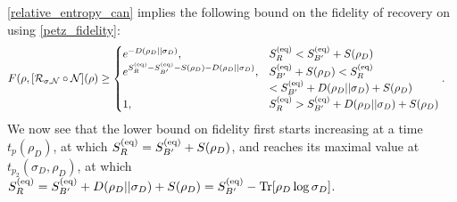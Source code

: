 \documentclass[a4paper,11pt]{article}
\begin{document}
\begin{enumerate}
\eqref{relative_entropy_can} implies the following bound on the fidelity of recovery on using \eqref{petz_fidelity}: 
\begin{align}
 &F(\rho, [\mathcal{R}_{\sigma,\mathcal{N}}\circ \mathcal{N}](\rho) \geq 
 \begin{cases}
 e^{-D(\rho_D \lvert \rvert \sigma_D)},& S_{R}^{\rm (eq)} <S_{B'}^{\rm (eq)} + S(\rho_D) 
 \\
 e^{S_{R}^{\rm (eq)} - S_{B'}^{\rm (eq)} - S(\rho_D)-D(\rho_D \lvert \rvert \sigma_D)}, & S_{B'}^{\rm (eq)} +S(\rho_D)< S_{R}^{\rm (eq)}
 \\
 & <S_{B'}^{\rm (eq)} +D(\rho_D \lvert \rvert \sigma_D) + S(\rho_D)
 \\
 1, & S_{R}^{\rm (eq)}> S_{B'}^{\rm (eq)} +D(\rho_D \lvert \rvert \sigma_D) + S(\rho_D)
 \end{cases}.
 \label{fidelity_general}
\end{align}
We now see that the lower bound on fidelity first starts increasing at a time $t_p(\rho_D)$, at which $S_{R}^{\rm (eq)} =S_{B'}^{\rm (eq)} + S(\rho_D)$, and reaches its maximal value at 
$t_{p_2}(\sigma_D, \rho_D)$, at which $S^{\rm (eq)}_R = S^{\rm (eq)}_{B'} + D(\rho_D || \sigma_D) +S(\rho_D) = S^{\rm (eq)}_{B'} - \text{Tr}[\rho_D \log \sigma_D]$. 




\end{enumerate}
\end{document}
